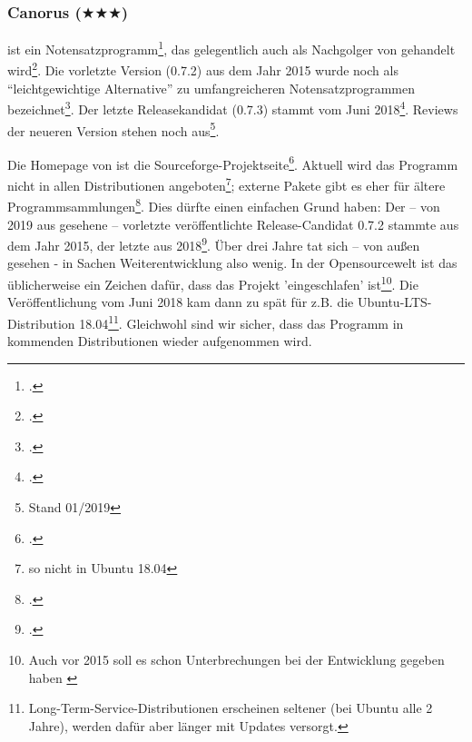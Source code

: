 %
%
%



\subsubsection{Canorus ($\bigstar$$\bigstar$$\bigstar$)}

\label{Canorus} ist ein Notensatzprogramm\footcite[vgl.][\nopage
wp]{Canorus2019a}, das gelegentlich auch als Nachgolger von 
gehandelt wird\footcite[vgl.][\nopage wp]{WpedCanorus2019a}. Die vorletzte
Version (0.7.2) aus dem Jahr 2015 wurde noch als \enquote{leichtgewichtige
Alternative} zu umfangreicheren Notensatzprogrammen
bezeichnet\footcite[vgl.][\nopage wp]{Kreussel2015a}. Der letzte Releasekandidat
(0.7.3) stammt vom Juni 2018\footcite[vgl.][\nopage wp]{Canorus2019b}. Reviews
der neueren Version stehen noch aus\footnote{Stand 01/2019}.

Die Homepage von  ist die
Sourceforge-Projektseite\footcite[vgl.][\nopage wp]{Canorus2019a}. Aktuell wird
das Programm nicht in allen Distributionen angeboten\footnote{so nicht in Ubuntu
18.04}; externe Pakete gibt es eher für ältere
Programmsammlungen\footcite[vgl.][\nopage wp]{RepoCanorus2019a}. Dies dürfte
einen einfachen Grund haben: Der -- von 2019 aus gesehene -- vorletzte
veröffentlichte Release-Candidat 0.7.2 stammte aus dem Jahr 2015, der letzte aus
2018\footcite[vgl.][\nopage wp]{Canorus2019b}. Über drei Jahre tat sich -- von
außen gesehen - in Sachen Weiterentwicklung also wenig. In der Opensourcewelt
ist das üblicherweise ein Zeichen dafür, dass das Projekt 'eingeschlafen'
ist\footnote{Auch vor 2015 soll es schon Unterbrechungen bei der Entwicklung
gegeben haben \cite[vgl.][\nopage wp]{UbuntuCanorus2014a}}. Die Veröffentlichung
vom Juni 2018 kam dann zu spät für z.B. die Ubuntu-LTS-Distribution
18.04\footnote{Long-Term-Service-Distributionen erscheinen seltener (bei Ubuntu
alle 2 Jahre), werden dafür aber länger mit Updates versorgt.}.
Gleichwohl sind wir sicher, dass das Programm in kommenden Distributionen wieder
aufgenommen wird.

